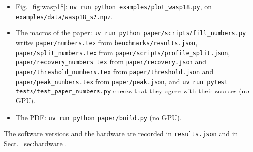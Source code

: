 \documentclass{aastex631}
\begin{document}
\begin{itemize}
\item Fig.~\ref{fig:wasp18}: \texttt{uv run python examples/plot\_wasp18.py}, on \texttt{examples/data/wasp18\_s2.npz}.
\item The macros of the paper: \texttt{uv run python paper/scripts/fill\_numbers.py} writes \texttt{paper/numbers.tex} from \texttt{benchmarks/results.json}, \texttt{paper/split\_numbers.tex} from \texttt{paper/scripts/profile\_split.json}, \texttt{paper/recovery\_numbers.tex} from \texttt{paper/recovery.json} and \texttt{paper/threshold\_numbers.tex} from \texttt{paper/threshold.json} and \texttt{paper/peak\_numbers.tex} from \texttt{paper/peak.json}, and \texttt{uv run pytest tests/test\_paper\_numbers.py} checks that they agree with their sources (no GPU).
\item The PDF: \texttt{uv run python paper/build.py} (no GPU).
\end{itemize}
The software versions and the hardware are recorded in \texttt{results.json} and in Sect.~\ref{sec:hardware}.



\end{document}
